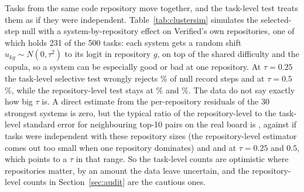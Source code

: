 \documentclass[11pt]{article}
\begin{document}
\begin{table}[t]
\centering\small
\resizebox{\textwidth}{!}{}
\caption{Split-half check of the record test on the real boards, \NumSplitR{} random halves per record step. Share of splits: how often the test on half 1 passes. Replicates: share of those splits in which the challenger still beats the holder on half 2. Null reference: the same quantity simulated for each step with its own number of disputed tasks under fair-coin signs, conditioned on the record event on the full data.}
\label{tab:split}
\end{table}

Tasks from the same code repository move together, and the task-level test treats them as if they were independent.
Table~\ref{tab:clustersim} simulates the selected-step null with a system-by-repository effect on Verified's own \NumClusterG{} repositories, one of which holds 231 of the 500 tasks: each system gets a random shift $u_{kg}\sim N(0,\tau^2)$ to its logit in repository $g$, on top of the shared difficulty and the copula, so a system can be especially good or bad at one repository.
At $\tau=0.25$ the task-level selective test wrongly rejects \NumClusterTaskQuarter\% of null record steps and at $\tau=0.5$ \NumClusterTaskHalf\%, while the repository-level test stays at \NumClusterCluQuarter\% and \NumClusterCluHalf\%.
The data do not say exactly how big $\tau$ is.
A direct estimate from the per-repository residuals of the 30 strongest systems is zero, but the typical ratio of the repository-level to the task-level standard error for neighbouring top-10 pairs on the real board is \NumClusterRealSe{}, against \NumClusterSeZero{} if tasks were independent with these repository sizes (the repository-level estimator comes out too small when one repository dominates) and \NumClusterSeQuarter{} and \NumClusterSeHalf{} at $\tau=0.25$ and $0.5$, which points to a $\tau$ in that range.
So the task-level counts are optimistic where repositories matter, by an amount the data leave uncertain, and the repository-level counts in Section~\ref{sec:audit} are the cautious ones.
\end{document}
